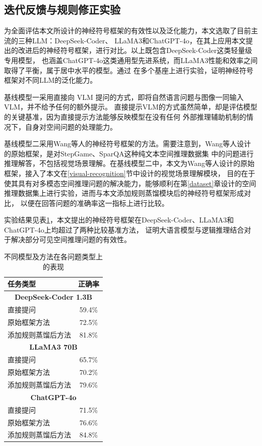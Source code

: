 \subsection{迭代反馈与规则修正实验}
为全面评估本文所设计的神经符号框架的有效性以及泛化能力，本文选取了目前主流的三种LLM：DeepSeek-Coder、
LLaMA3和ChatGPT-4o，在其上应用本文提出的改进后的神经符号框架，进行对比。以上既包含DeepSeek-Coder这类轻量级专用模型，
也涵盖ChatGPT-4o这类通用型先进系统，而LLaMA3性能和效率之间取得了平衡，属于居中水平的模型。通过
在多个基座上进行实验，证明神经符号框架对不同LLM的泛化能力。

基线模型一采用直接向 VLM 提问的方式，即将自然语言问题与图像一同输入 VLM，并不给予任何的额外提示。
直接提示VLM的方式虽然简单，却是评估模型的关键基准，因为直接提示方法能够反映模型在没有任何
外部推理辅助机制的情况下，自身对空间问题的处理能力。

基线模型二采用Wang等人\cite{wang2024dspy}的神经符号框架的方法。需要注意到，Wang等人设计的原始框架，是对StepGame、SparQA这种纯文本空间推理数据集
中的问题进行推理解答，不包括视觉场景理解。在基线模型二中，本文为Wang等人设计的原始框架，接入了本文在\ref{visual-recognition}节中设计的视觉场景理解模块，
目的在于使其具有对多模态空间推理问题的解决能力，能够顺利在第\ref{dataset}章设计的空间推理数据集上进行实验，进而与本文添加规则蒸馏模块后的神经符号框架形成对比，
以便在回答问题的准确率这一指标上进行比较。

实验结果见表\ref{tab:overall_comparison}，本文提出的神经符号框架在DeepSeek-Coder、LLaMA3和ChatGPT-4o上均超过了两种比较基准方法，
证明大语言模型与逻辑推理结合对于解决部分可见空间推理问题的有效性。

\begin{table}[h]
    \centering
    \begin{tabular}{lc}
        \toprule
        \textbf{任务类型} & \textbf{正确率} \\
        \midrule
        \multicolumn{2}{c}{\textbf{DeepSeek-Coder 1.3B}} \\
        直接提问 & 59.4\% \\
        原始框架方法 & 72.5\% \\
        添加规则蒸馏后方法 & 81.8\% \\
        \midrule
        \multicolumn{2}{c}{\textbf{LLaMA3 70B}} \\
        直接提问 & 65.7\% \\
        原始框架方法 & 70.2\% \\
        添加规则蒸馏后方法 & 79.6\% \\
        \midrule
        \multicolumn{2}{c}{\textbf{ChatGPT-4o}} \\
        直接提问 & 71.5\% \\
        原始框架方法 & 76.6\% \\
        添加规则蒸馏后方法 & 84.8\% \\
        \bottomrule
    \end{tabular}
    \caption{不同模型及方法在各问题类型上的表现}
    \label{tab:overall_comparison}
\end{table}
